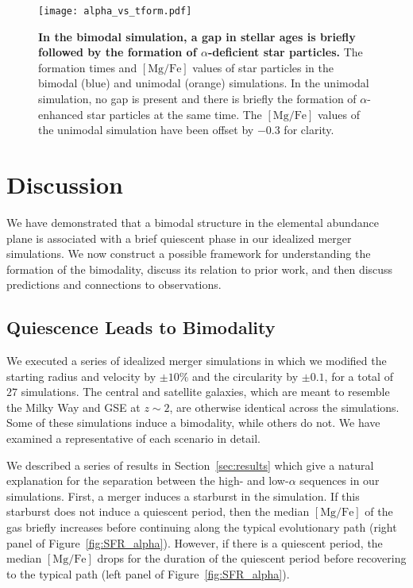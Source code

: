 \documentclass[twocolumn,linenumbers,trackchanges]{aastex631}
\newcommand{\MgFe}{\ensuremath{[\textrm{Mg}/\textrm{Fe}]}}
\begin{document}
\begin{figure}
  \centering
  \texttt{[image: alpha\_vs\_tform.pdf]}
  \caption{\textbf{In the bimodal simulation, a gap in stellar ages is briefly followed by the formation of $\alpha$-deficient star particles.} The formation times and \MgFe{} values of star particles in the bimodal (blue) and unimodal (orange) simulations. In the unimodal simulation, no gap is present and there is briefly the formation of $\alpha$-enhanced star particles at the same time. The \MgFe{} values of the unimodal simulation have been offset by $-0.3$ for clarity.}
  \label{fig:alpha_vs_tform}
\end{figure}

\section{Discussion}\label{sec:discussion}
We have demonstrated that a bimodal structure in the elemental abundance plane is associated with a brief quiescent phase in our idealized merger simulations. We now construct a possible framework for understanding the formation of the bimodality, discuss its relation to prior work, and then discuss predictions and connections to observations.

\subsection{Quiescence Leads to Bimodality}\label{ssec:formqui}
We executed a series of idealized merger simulations in which we modified the starting radius and velocity by $\pm10\%$ and the circularity by $\pm0.1$, for a total of $27$ simulations. The central and satellite galaxies, which are meant to resemble the Milky Way and GSE at $z\sim2$, are otherwise identical across the simulations. Some of these simulations induce a bimodality, while others do not. We have examined a representative of each scenario in detail.

We described a series of results in Section~\ref{sec:results} which give a natural explanation for the separation between the high- and low-$\alpha$ sequences in our simulations. First, a merger induces a starburst in the simulation. If this starburst does not induce a quiescent period, then the median \MgFe{} of the gas briefly increases before continuing along the typical evolutionary path (right panel of Figure~\ref{fig:SFR_alpha}). However, if there is a quiescent period, the median \MgFe{} drops for the duration of the quiescent period before recovering to the typical path (left panel of Figure~\ref{fig:SFR_alpha}).
\end{document}
